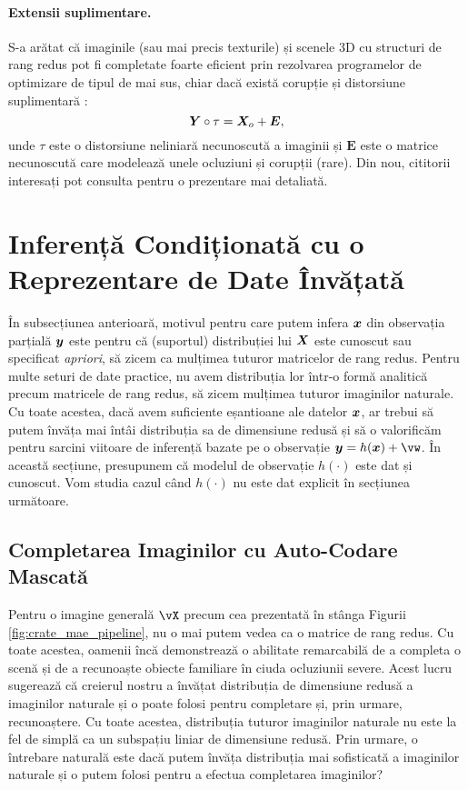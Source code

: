 \documentclass[../../book-main_ro.tex]{subfiles}
\begin{document}
\paragraph{Extensii suplimentare.}
S-a arătat că imaginile (sau mai precis texturile) și scenele 3D
cu structuri de rang redus pot fi completate foarte eficient prin
rezolvarea programelor de optimizare de tipul de mai sus, chiar dacă există
corupție și distorsiune suplimentară
\cite{Zhang2010TILTTI,Liang-ECCV2012,Yi_2023_ICCV}:
\begin{equation}
    \bm{Y} \circ \tau = \bm{X}_o + \boldsymbol{E},
\end{equation}
unde $\tau$ este o distorsiune neliniară necunoscută a imaginii și $\boldsymbol{E}$ este o matrice necunoscută care modelează unele ocluziuni și corupții (rare). Din nou, cititorii interesați pot consulta \cite{Wright-Ma-2022} pentru o prezentare mai detaliată.

\section{Inferență Condiționată cu o Reprezentare de Date Învățată}
În subsecțiunea anterioară, motivul pentru care putem infera $\bm{x}$ din observația parțială $\bm{y}$ este pentru că (suportul) distribuției lui $\bm{X}$ este cunoscut sau specificat {\em apriori}, să zicem ca mulțimea tuturor matricelor de rang redus. Pentru multe seturi de date practice, nu avem distribuția lor într-o formă analitică precum matricele de rang redus, să zicem mulțimea tuturor imaginilor naturale. Cu toate acestea, dacă avem suficiente eșantioane ale datelor $\bm{x}$, ar trebui să putem învăța mai întâi distribuția sa de dimensiune redusă și să o valorificăm pentru sarcini viitoare de inferență bazate pe o observație $\y = h(\x) + \vw$. În această secțiune, presupunem că modelul de observație $h(\cdot)$ este dat și cunoscut. Vom studia cazul când $h(\cdot)$ nu este dat explicit în secțiunea următoare.


\subsection{Completarea Imaginilor cu Auto-Codare Mascată}
Pentru o imagine generală $\vX$ precum cea prezentată în stânga Figurii
\ref{fig:crate_mae_pipeline}, nu o mai putem vedea ca o matrice de rang
redus. Cu toate acestea, oamenii încă demonstrează o abilitate remarcabilă de a
completa o scenă și de a recunoaște obiecte familiare în ciuda ocluziunii
severe. Acest lucru sugerează că creierul nostru a învățat
distribuția de dimensiune redusă a imaginilor naturale și o poate folosi pentru
completare și, prin urmare, recunoaștere. Cu toate acestea, distribuția tuturor
imaginilor naturale nu este la fel de simplă ca un subspațiu liniar de dimensiune redusă.
Prin urmare, o întrebare naturală este dacă putem învăța distribuția mai
sofisticată a imaginilor naturale și o putem folosi pentru a efectua
completarea imaginilor?
\end{document}
